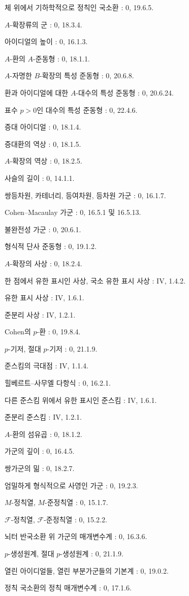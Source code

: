 체 위에서 기하학적으로 정칙인 국소환 : 0, 19.6.5.\par
$A$-확장류의 군 : 0, 18.3.4.\par

아이디얼의 높이 : 0, 16.1.3.\par
$A$-환의 $A$-준동형 : 0, 18.1.1.\par
$A$-자명한 $B$-확장의 특성 준동형 : 0, 20.6.8.\par
환과 아이디얼에 대한 $A$-대수의 특성 준동형 : 0, 20.6.24.\par
표수 $p>0$인 대수의 특성 준동형 : 0, 22.4.6.\par

증대 아이디얼 : 0, 18.1.4.\par
증대환의 역상 : 0, 18.1.5.\par
$A$-확장의 역상 : 0, 18.2.5.\par

사슬의 길이 : 0, 14.1.1.\par

쌍등차원, 카테너리, 등여차원, 등차원 가군 : 0, 16.1.7.\par
Cohen--Macaulay 가군 : 0, 16.5.1 및 16.5.13.\par
불완전성 가군 : 0, 20.6.1.\par
형식적 단사 준동형 : 0, 19.1.2.\par
$A$-확장의 사상 : 0, 18.2.4.\par
한 점에서 유한 표시인 사상, 국소 유한 표시 사상 : IV, 1.4.2.\par
유한 표시 사상 : IV, 1.6.1.\par
준분리 사상 : IV, 1.2.1.\par

Cohen의 $p$-환 : 0, 19.8.4.\par
$p$-기저, 절대 $p$-기저 : 0, 21.1.9.\par
준스킴의 극대점 : IV, 1.1.4.\par

\clearpage
{}
힐베르트--사무엘 다항식 : 0, 16.2.1.\par
다른 준스킴 위에서 유한 표시인 준스킴 : IV, 1.6.1.\par
준분리 준스킴 : IV, 1.2.1.\par
$A$-환의 섬유곱 : 0, 18.1.2.\par
가군의 깊이 : 0, 16.4.5.\par

쌍가군의 밂 : 0, 18.2.7.\par
엄밀하게 형식적으로 사영인 가군 : 0, 19.2.3.\par
$M$-정칙열, $M$-준정칙열 : 0, 15.1.7.\par
$\mathscr F$-정칙열, $\mathscr F$-준정칙열 : 0, 15.2.2.\par
뇌터 반국소환 위 가군의 매개변수계 : 0, 16.3.6.\par
$p$-생성원계, 절대 $p$-생성원계 : 0, 21.1.9.\par
열린 아이디얼들, 열린 부분가군들의 기본계 : 0, 19.0.2.\par
정칙 국소환의 정칙 매개변수계 : 0, 17.1.6.\par

